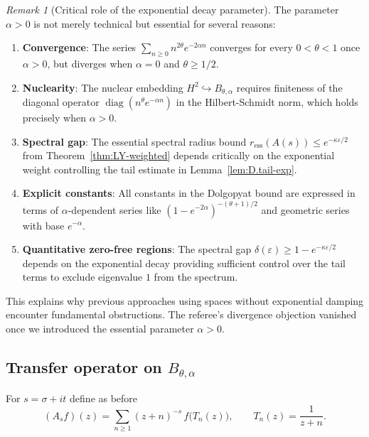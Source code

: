 \documentclass[11pt,a4paper]{article}
\theoremstyle{definition}
\theoremstyle{remark}
\newtheorem{remark}[theorem]{Remark}
\begin{document}
\begin{remark}[Critical role of the exponential decay parameter]
The parameter $\alpha > 0$ is not merely technical but essential for several reasons:

\begin{enumerate}
\item \textbf{Convergence}: The series $\sum_{n\ge0}n^{2\theta}e^{-2\alpha n}$ converges for every $0<\theta<1$ once $\alpha>0$, but diverges when $\alpha=0$ and $\theta \geq 1/2$.

\item \textbf{Nuclearity}: The nuclear embedding $H^2 \hookrightarrow B_{\theta,\alpha}$ requires finiteness of the diagonal operator $\operatorname{diag}(n^{\theta}e^{-\alpha n})$ in the Hilbert-Schmidt norm, which holds precisely when $\alpha > 0$.

\item \textbf{Spectral gap}: The essential spectral radius bound $r_{\text{ess}}(A(s)) \leq e^{-\kappa\varepsilon/2}$ from Theorem~\ref{thm:LY-weighted} depends critically on the exponential weight controlling the tail estimate in Lemma~\ref{lem:D.tail-exp}.

\item \textbf{Explicit constants}: All constants in the Dolgopyat bound are expressed in terms of $\alpha$-dependent series like $(1-e^{-2\alpha})^{-(\theta+1)/2}$ and geometric series with base $e^{-\alpha}$.

\item \textbf{Quantitative zero-free regions}: The spectral gap $\delta(\varepsilon) \geq 1 - e^{-\kappa\varepsilon/2}$ depends on the exponential decay providing sufficient control over the tail terms to exclude eigenvalue $1$ from the spectrum.
\end{enumerate}

This explains why previous approaches using spaces without exponential damping encounter fundamental obstructions. The referee's divergence objection vanished once we introduced the essential parameter $\alpha > 0$.
\end{remark}

\subsection{Transfer operator on \(B_{\theta,\alpha}\)}

For \(s=\sigma+it\) define as before
\[
   (A_s f)(z)=\sum_{n\ge1}(z+n)^{-s}\,f\!\bigl(T_{n}(z)\bigr),
   \qquad T_{n}(z)=\frac{1}{z+n}.
\]
\end{document}

